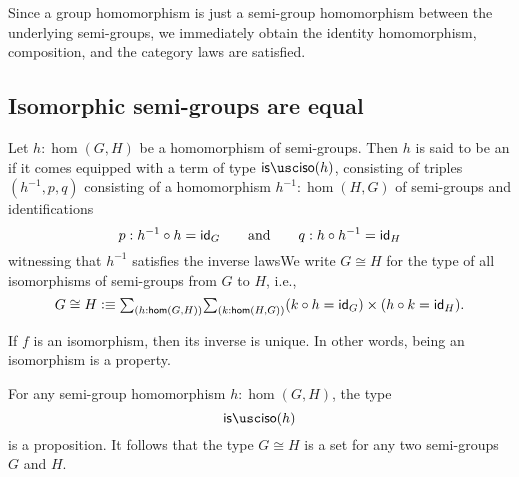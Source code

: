 \begin{rmk}
  Since a group homomorphism is just a semi-group homomorphism between the underlying semi-groups, we immediately obtain the identity homomorphism, composition, and the category laws are satisfied.
\end{rmk}

\subsection{Isomorphic semi-groups are equal}

\begin{defn}
Let $h:\hom(G,H)$ be a homomorphism of semi-groups. Then $h$ is said to be an  if it comes equipped with a term of type $\isiso(h)$, consisting of triples $(h^{-1},p,q)$ consisting of a homomorphism $h^{-1}:\hom(H,G)$ of semi-groups and identifications
\begin{equation*}
p:h^{-1}\circ h=\idfunc[G]\qquad\text{and}\qquad q:h\circ h^{-1}=\idfunc[H]
\end{equation*}
witnessing that $h^{-1}$ satisfies the inverse lawsWe write $G\cong H$ for the type of all isomorphisms of semi-groups from $G$ to $H$, i.e.,
\begin{equation*}
G\cong H \defeq \sm{h:\hom(G,H)}{k:\hom(H,G)} (k\circ h = \idfunc[G])\times (h\circ k=\idfunc[H]).
\end{equation*}
\end{defn}

If $f$ is an isomorphism, then its inverse is unique. In other words, being an isomorphism is a property.

\begin{lem}
  For any semi-group homomorphism $h:\hom(G,H)$, the type
  \begin{equation*}
    \isiso(h)
  \end{equation*}
  is a proposition. It follows that the type $G\cong H$ is a set for any two semi-groups $G$ and $H$.
\end{lem}

